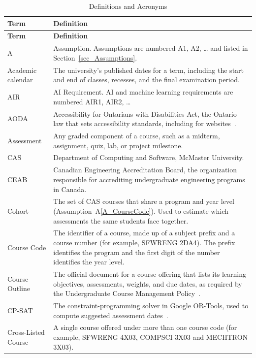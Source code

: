 \documentclass[12pt]{article}
\newcommand{\asref}[1]{A\ref{#1}}
\begin{document}
{\small
\renewcommand{\arraystretch}{1.2}
\begin{longtable}{>{\raggedright\arraybackslash}p{} >{\raggedright\arraybackslash}p{}}
\toprule
\textbf{Term} & \textbf{Definition}\\
\midrule
\endfirsthead
\toprule
\textbf{Term} & \textbf{Definition}\\
\midrule
\endhead
\endfoot
\bottomrule
\caption{Definitions and Acronyms} \label{tab:DefinitionsAndAcronyms}
\endlastfoot
A & Assumption. Assumptions are numbered A1, A2, \ldots{} and listed in Section~\ref{sec_Assumptions}.\\
Academic calendar & The university's published dates for a term, including the start and end of classes, recesses, and the final examination period.\\
AIR & AI Requirement. AI and machine learning requirements are numbered AIR1, AIR2, \ldots{}\\
AODA & Accessibility for Ontarians with Disabilities Act, the Ontario law that sets accessibility standards, including for websites~\citep{AODA2005, IASR2011}.\\
Assessment & Any graded component of a course, such as a midterm, assignment, quiz, lab, or project milestone.\\
CAS & Department of Computing and Software, McMaster University.\\
CEAB & Canadian Engineering Accreditation Board, the organization responsible for accrediting undergraduate engineering programs in Canada.\\
Cohort & The set of CAS courses that share a program and year level (Assumption~\asref{A_CourseCode}). Used to estimate which assessments the same students face together.\\
Course Code & The identifier of a course, made up of a subject prefix and a course number (for example, SFWRENG 2DA4). The prefix identifies the program and the first digit of the number identifies the year level.\\
Course Outline & The official document for a course offering that lists its learning objectives, assessments, weights, and due dates, as required by the Undergraduate Course Management Policy~\citep{McMasterUCMP2025}.\\
CP-SAT & The constraint-programming solver in Google OR-Tools, used to compute suggested assessment dates~\citep{ORToolsCPSAT}.\\
Cross-Listed Course & A single course offered under more than one course code (for example, SFWRENG 4X03, COMPSCI 3X03 and MECHTRON 3X03).\\

\end{longtable}}
\end{document}
